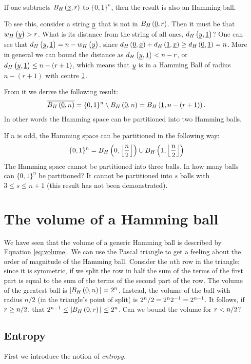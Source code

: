 If one subtracts $B_H\left(\underline{x}, r\right)$ to $\{0, 1\}^n$, then the result is also an Hamming ball.

To see this, consider a string $\underline{y}$ that is not in $B_H\left(\underline{0}, r\right)$.
Then it must be that $w_H\left(\underline{y}\right) > r$.
What is its distance from the string of all ones, \ie $d_H \left({\underline{y},\underline{1}}\right)$?
One can see that $d_H \left({\underline{y},\underline{1}}\right) = n - w_H\left(\underline{y}\right)$, since $d_H \left({\underline{0},\underline{x}}\right) + d_H \left({\underline{1},\underline{x}}\right) \ge d_H \left({\underline{0},\underline{1}}\right) = n$.
More in general we can bound the distance as $d_H \left({\underline{y},\underline{1}}\right) < n - r$, or $d_H \left({\underline{y},\underline{1}}\right) \le n - (r+1)$, which means that $\underline{y}$ is in a Hamming Ball of radius $n - (r+1)$ with centre $\underline{1}$.

From it we derive the following result:
\begin{equation}
	\overline{B_H\left(\underline{0}, n\right)} = \{0,1\}^{n} \setminus B_H\left(\underline{0}, n\right) = B_H\left(\underline{1}, n - (r+1)\right).
\end{equation}
In other words the Hamming space can be partitioned into two Hamming balls.

If $n$ is odd, the Hamming space can be partitioned in the following way: $$\{0, 1\}^n = B_H\left(0, \left\lfloor{\frac{n}{2}}\right\rfloor\right) \cup B_H\left(1, \left\lfloor{\frac{n}{2}}\right\rfloor\right)$$
The Hamming space cannot be partitioned into three balls.
In how many balls can $\{0, 1\}^n$ be partitioned?
It cannot be partitioned into $s$ balls with $3 \leq s \leq n + 1$ (this result has not been demonstrated).

\section{The volume of a Hamming ball}
We have seen that the volume of a generic Hamming ball is described by Equation \ref{eq:volume}. We can use the Pascal triangle to get a feeling about the order of magnitude of the Hamming ball. Consider the $n$th row in the triangle; since it is symmetric, if we split the row in half the sum of the terms of the first part is equal to the sum of the terms of the second part of the row. The volume of the greatest ball is $|B_H\left(0, n\right)| = 2^n$. Instead, the volume of the ball with radius $n/2$ (in the triangle's point of split) is ${2^n}/{2} = 2^n2^{-1} = 2^{n-1}$. It follows, if $r \geq {n}/{2}$, that $2^{n-1} \leq |B_H\left(0, r\right)| \leq 2^n$. Can we bound the volume for $r < {n}/{2}$?

\subsection{Entropy}
First we introduce the notion of \emph{entropy}.

